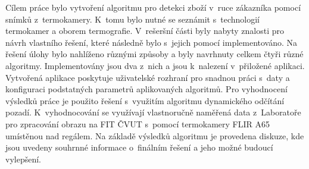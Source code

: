 \begin{conclusion}
Cílem práce bylo vytvoření algoritmu pro detekci zboží v~ruce zákazníka pomocí snímků z~termokamery. K~tomu bylo nutné se seznámit s~technologií termokamer a oborem termografie. V~rešeršní části byly nabyty znalosti pro návrh vlastního řešení, které následně bylo s~jejich pomocí implementováno. Na řešení úlohy bylo nahlíženo různými způsoby a byly navrhnuty celkem čtyři různé algoritmy. Implementovány jsou dva z~nich a jsou k~nalezení v~přiložené aplikaci. Vytvořená aplikace poskytuje uživatelské rozhraní pro snadnou práci s~daty a konfiguraci podstatných parametrů aplikovaných algoritmů. Pro vyhodnocení výsledků práce je použito řešení s~využitím algoritmu dynamického odčítání pozadí. K~vyhodnocování se využívají vlastnoručně naměřená data z~Laboratoře pro zpracování obrazu na FIT ČVUT s~pomocí termokamery FLIR A65 umístěnou nad regálem. Na základě výsledků algoritmu je provedena diskuze, kde jsou uvedeny souhrnné informace o~finálním řešení a jeho možné budoucí vylepšení.

    

\end{conclusion}